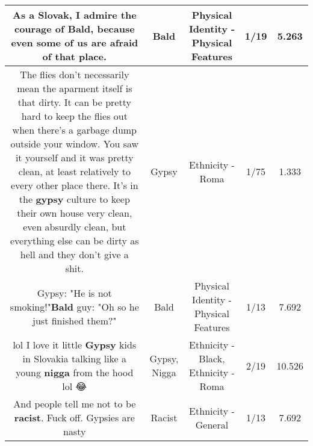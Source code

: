 \documentclass[11pt]{article}
\newlength\mylength
\begin{document}
\begin{center}
\begin{longtable}{|C{.65\mylength}|C{.30\mylength}|C{.12\mylength}|C{.12\mylength}|C{.12\mylength}|}
  \small As a Slovak, I admire the courage of \textbf{Bald}, because even some of us are afraid of that place.\normalsize   & Bald & Physical Identity - Physical Features & 1/19 & 5.263 \\  \hline
  \small The flies don't necessarily mean the aparment itself is that dirty. It can be pretty hard to keep the flies out when there's a garbage dump outside your window. You saw it yourself and it was pretty clean, at least relatively to every other place there. It's in the \textbf{gypsy} culture to keep their own house very clean, even absurdly clean, but everything else can be dirty as hell and they don't give a shit.\normalsize   & Gypsy & Ethnicity - Roma & 1/75 & 1.333 \\  \hline
  \small Gypsy: "He is not smoking!"\textbf{Bald} guy: "Oh so he just finished them?"\normalsize   & Bald & Physical Identity - Physical Features & 1/13 & 7.692 \\  \hline
  \small lol I love it little \textbf{Gypsy} kids in Slovakia talking like a young \textbf{nigga} from the hood lol 😂\normalsize   & Gypsy, Nigga & Ethnicity - Black, Ethnicity - Roma & 2/19 & 10.526 \\  \hline
  \small And people tell me not to be \textbf{racist}. Fuck off. Gypsies are nasty\normalsize   & Racist & Ethnicity - General & 1/13 & 7.692 \\  \hline

\end{longtable}
\end{center}
\end{document}
